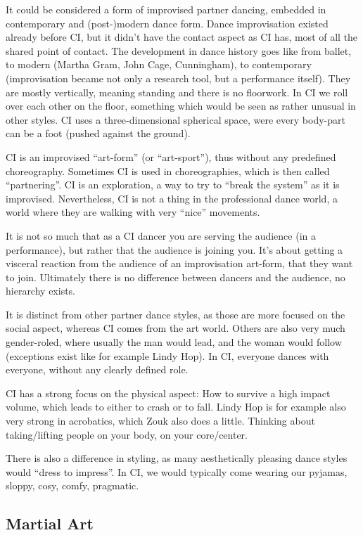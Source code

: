 It could be considered a form of improvised partner dancing, embedded in contemporary and (post-)modern dance form.
Dance improvisation existed already before CI, but it didn't have the contact aspect as CI has, most of all the shared point of contact.
The development in dance history goes like from ballet, to modern (Martha Gram, John Cage, Cunningham), to contemporary (improvisation became not only a research tool, but a performance itself).
They are mostly vertically, meaning standing and there is no floorwork.
In CI we roll over each other on the floor, something which would be seen as rather unusual in other styles.
CI uses a three-dimensional spherical space, were every body-part can be a foot (pushed against the ground).

CI is an improvised ``art-form'' (or ``art-sport''), thus without any predefined choreography.
Sometimes CI is used in choreographies, which is then called ``partnering''.
CI is an exploration, a way to try to ``break the system'' as it is improvised.
Nevertheless, CI is not a thing in the professional dance world, a world where they are walking with very ``nice'' movements.

It is not so much that as a CI dancer you are serving the audience (in a performance), but rather that the audience is joining you.
It's about getting a visceral reaction from the audience of an improvisation art-form, that they want to join.
Ultimately there is no difference between dancers and the audience, no hierarchy exists.

It is distinct from other partner dance styles, as those are more focused on the social aspect, whereas CI comes from the art world.
Others are also very much gender-roled, where usually the man would lead, and the woman would follow (exceptions exist like for example Lindy Hop).
In CI, everyone dances with everyone, without any clearly defined role.

CI has a strong focus on the physical aspect: How to survive a high impact volume, which leads to either to crash or to fall.
Lindy Hop is for example also very strong in acrobatics, which Zouk also does a little.
Thinking about taking/lifting people on your body, on your core/center.

There is also a difference in styling, as many aesthetically pleasing dance styles would ``dress to impress''.
In CI, we would typically come wearing our pyjamas, sloppy, cosy, comfy, pragmatic.

\subsection{Martial Art}\label{subsec:martial-art}

